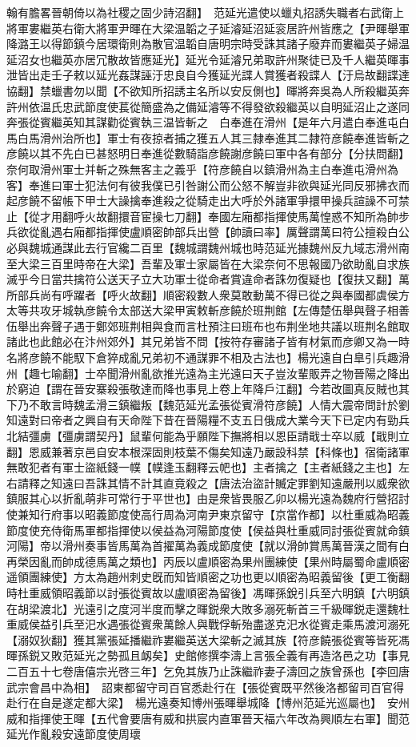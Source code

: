 翰有膽畧晉朝倚以為社稷之固少詩沼翻】　范延光遣使以蠟丸招誘失職者右武衛上將軍婁繼英右衛大將軍尹暉在大梁温韜之子延濬延沼延衮居許州皆應之【尹暉舉軍降潞王以得節鎮今居環衛則為散官温韜自唐明宗時受誅其諸子廢弃而婁繼英子婦温延沼女也繼英亦居冗散故皆應延光】延光令延濬兄弟取許州聚徒已及千人繼英暉事泄皆出走壬子敕以延光姦謀誣汙忠良自今獲延光諜人賞獲者殺諜人【汙烏故翻諜達協翻】禁蠟書勿以聞【不欲知所招誘主名所以安反側也】暉將奔吳為人所殺繼英奔許州依温氏忠武節度使萇從簡盛為之備延濬等不得發欲殺繼英以自明延沼止之遂同奔張從賓繼英知其謀勸從賓執三温皆斬之　白奉進在滑州【是年六月遣白奉進屯白馬白馬滑州治所也】軍士有夜掠者捕之獲五人其三隸奉進其二隸符彦饒奉進皆斬之彦饒以其不先白已甚怒明日奉進從數騎詣彦饒謝彦饒曰軍中各有部分【分扶問翻】奈何取滑州軍士并斬之殊無客主之義乎【符彦饒自以鎮滑州為主白奉進屯滑州為客】奉進曰軍士犯法何有彼我僕已引咎謝公而公怒不解豈非欲與延光同反邪拂衣而起彦饒不留帳下甲士大譟擒奉進殺之從騎走出大呼於外諸軍爭擐甲操兵諠譟不可禁止【從才用翻呼火故翻擐音宦操七刀翻】奉國左廂都指揮使馬萬惶惑不知所為帥步兵欲從亂遇右廂都指揮使盧順密帥部兵出營【帥讀曰率】厲聲謂萬曰符公擅殺白公必與魏城通謀此去行官纔二百里【魏城謂魏州城也時范延光據魏州反九域志滑州南至大梁三百里時帝在大梁】吾輩及軍士家屬皆在大梁奈何不思報國乃欲助亂自求族滅乎今日當共擒符公送天子立大功軍士從命者賞違命者誅勿復疑也【復扶又翻】萬所部兵尚有呼躍者【呼火故翻】順密殺數人衆莫敢動萬不得已從之與奉國都虞侯方太等共攻牙城執彦饒令太部送大梁甲寅敕斬彦饒於班荆館【左傳楚伍舉與聲子相善伍舉出奔聲子遇于鄭郊班荆相與食而言杜預注曰班布也布荆坐地共議以班荆名館取諸此也此館必在汴州郊外】其兄弟皆不問【按符存審諸子皆有材氣而彦卿又為一時名將彦饒不能馭下倉猝成亂兄弟初不通謀罪不相及古法也】楊光遠自白臯引兵趣滑州【趣七喻翻】士卒聞滑州亂欲推光遠為主光遠曰天子豈汝輩販弄之物晉陽之降出於窮迫【謂在晉安寨殺張敬達而降也事見上卷上年降戶江翻】今若改圖真反賊也其下乃不敢言時魏孟滑三鎮繼叛【魏范延光孟張從賓滑符彦饒】人情大震帝問計於劉知遠對曰帝者之興自有天命陛下昔在晉陽糧不支五日俄成大業今天下已定内有勁兵北結彊虜【彊虜謂契丹】鼠輩何能為乎願陛下撫將相以恩臣請戢士卒以威【戢則立翻】恩威兼著京邑自安本根深固則枝葉不傷矣知遠乃嚴設科禁【科條也】宿衛諸軍無敢犯者有軍士盜紙錢一幞【幞逢玉翻釋云帊也】主者擒之【主者紙錢之主也】左右請釋之知遠曰吾誅其情不計其直竟殺之【唐法治盜計贓定罪劉知遠嚴刑以威衆欲鎮服其心以折亂萌非可常行于平世也】由是衆皆畏服乙卯以楊光遠為魏府行營招討使兼知行府事以昭義節度使高行周為河南尹東京留守【京當作都】以杜重威為昭義節度使充侍衛馬軍都指揮使以侯益為河陽節度使【侯益與杜重威同討張從賓就命鎮河陽】帝以滑州奏事皆馬萬為首擢萬為義成節度使【就以滑帥賞馬萬晉漢之間有白再榮因亂而帥成德馬萬之類也】丙辰以盧順密為果州團練使【果州時屬蜀命盧順密遥領團練使】方太為趙州刺史旣而知皆順密之功也更以順密為昭義留後【更工衡翻時杜重威領昭義節以討張從賓故以盧順密為留後】馮暉孫銳引兵至六明鎮【六明鎮在胡梁渡北】光遠引之度河半度而擊之暉鋭衆大敗多溺死斬首三千級暉鋭走還魏杜重威侯益引兵至汜水遇張從賓衆萬餘人與戰俘斬殆盡遂克汜水從賓走乘馬渡河溺死【溺奴狄翻】獲其黨張延播繼祚婁繼英送大梁斬之滅其族【符彦饒張從賓等皆死馮暉孫鋭又敗范延光之勢孤且衂矣】史館修撰李濤上言張全義有再造洛邑之功【事見二百五十七卷唐僖宗光啓三年】乞免其族乃止誅繼祚妻子濤回之族曾孫也【李回唐武宗會昌中為相】　詔東都留守司百官悉赴行在【張從賓既平然後洛都留司百官得赴行在自是遂定都大梁】　楊光遠奏知博州張暉舉城降【博州范延光巡屬也】　安州威和指揮使王暉【五代會要唐有威和拱宸内直軍晉天福六年改為興順左右軍】聞范延光作亂殺安遠節度使周瓌